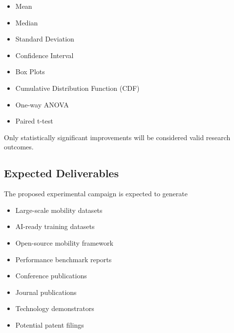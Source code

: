 \documentclass[12pt,a4paper]{article}\usepackage[a4paper,margin=1in]{geometry}\usepackage{graphicx}\usepackage{longtable}\usepackage{booktabs}\usepackage{hyperref}\usepackage{enumitem}\usepackage{amsmath}\usepackage{tikz}\usepackage{pgfgantt}\usepackage{setspace}\setstretch{1.15}\usetikzlibrary{positioning,arrows.meta,shapes.geometric}
\begin{document}
	\begin{itemize}
		
		\item Mean
		
		\item Median
		
		\item Standard Deviation
		
		\item Confidence Interval
		
		\item Box Plots
		
		\item Cumulative Distribution Function (CDF)
		
		\item One-way ANOVA
		
		\item Paired t-test
		
	\end{itemize}
	
	Only statistically significant improvements will be considered valid research outcomes.
	
	
	\subsection{Expected Deliverables}
	
	The proposed experimental campaign is expected to generate
	
	\begin{itemize}
		
		\item Large-scale mobility datasets
		
		\item AI-ready training datasets
		
		\item Open-source mobility framework
		
		\item Performance benchmark reports
		
		\item Conference publications
		
		\item Journal publications
		
		\item Technology demonstrators
		
		\item Potential patent filings
		
	\end{itemize}
	
\end{document}
